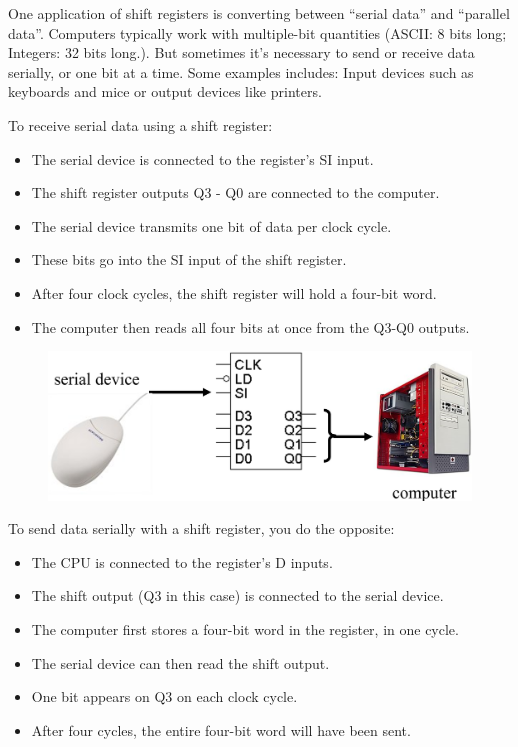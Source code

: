 One application of shift registers is converting between ``serial data'' and ``parallel data''. Computers typically work with multiple-bit quantities (ASCII: 8 bits long; Integers: 32 bits long.). But sometimes it's necessary to send or receive data serially, or one bit at a time. Some examples includes: Input devices such as keyboards and mice or output devices like printers.

To receive serial data using a shift register:
\begin{itemize}[leftmargin=0.7cm]
  \item The serial device is connected to the register's SI input.
  \item The shift register outputs Q3 - Q0 are connected to the computer.
  \item The serial device transmits one bit of data per clock cycle.
  \item These bits go into the SI input of the shift register.
  \item After four clock cycles, the shift register will hold a four-bit word.
  \item The computer then reads all four bits at once from the Q3-Q0 outputs.
\end{itemize}

\begin{figure}[H]
  \centering
  \includegraphics[width=\linewidth]{img/receiving-serial-data.png}
\end{figure}

To send data serially with a shift register, you do the opposite:
\begin{itemize}
  \item The CPU is connected to the register's D inputs.
  \item The shift output (Q3 in this case) is connected to the serial device.
  \item The computer first stores a four-bit word in the register, in one cycle.
  \item The serial device can then read the shift output.
  \item One bit appears on Q3 on each clock cycle.
  \item After four cycles, the entire four-bit word will have been sent.
\end{itemize}

